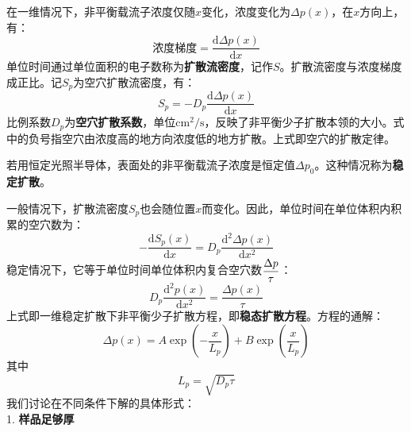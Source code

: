 在一维情况下，非平衡载流子浓度仅随$x$变化，浓度变化为$\Delta p(x)$，在$x$方向上，有：
\begin{equation}
    \text{浓度梯度}=\frac{\mathrm{d}\Delta p(x)}{\mathrm{d}x}
\end{equation}
单位时间通过单位面积的电子数称为\textbf{扩散流密度}，记作$S$。扩散流密度与浓度梯度成正比。记$S_p$为空穴扩散流密度，有：
\begin{equation}
    S_p=-D_p\frac{\mathrm{d}\Delta p(x)}{\mathrm{d}x}\label{eq:chap-5-uneqilibrium-hole-diffusion-law}
\end{equation}
比例系数$D_p$为\textbf{空穴扩散系数}，单位$\mathrm{cm^2/s}$，反映了非平衡少子扩散本领的大小。式中的负号指空穴由浓度高的地方向浓度低的地方扩散。上式即空穴的扩散定律。

若用恒定光照半导体，表面处的非平衡载流子浓度是恒定值$\Delta p_0$。这种情况称为\textbf{稳定扩散}。

一般情况下，扩散流密度$S_p$也会随位置$x$而变化。因此，单位时间在单位体积内积累的空穴数为：
\begin{equation}
    -\frac{\mathrm{d}S_p(x)}{\mathrm{d}x}=D_p\frac{\mathrm{d^2}\Delta p(x)}{\mathrm{d}x^2}
\end{equation}
稳定情况下，它等于单位时间单位体积内复合空穴数$\displaystyle\frac{\Delta p}{\tau}$：
\begin{equation}
    D_p\frac{\mathrm{d}^2p(x)}{\mathrm{d}x^2}=\frac{\Delta p(x)}{\tau}
\end{equation}
上式即一维稳定扩散下非平衡少子扩散方程，即\textbf{稳态扩散方程}。方程的通解：
\begin{equation}
    \Delta p(x)=A\exp{\left(-\frac{x}{L_p}\right)}+B\exp{\left(\frac{x}{L_p}\right)}
\end{equation}
其中
\begin{equation}
    L_p=\sqrt{D_p\tau}
\end{equation}
我们讨论在不同条件下解的具体形式：\vspace{1ex}\\
1. \textbf{样品足够厚}

